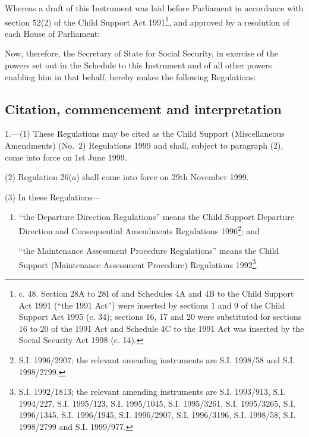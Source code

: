 \documentclass[12pt,a4paper]{article}
\title{\regstitle}
\author{S.I. 1999 No. 1047}
\date{Made 29th March 1999\\Coming into force\\---except for regulation 26($a$) 1st June 1999\\---regulation 26($a$) 29th November 1999}
\begin{document}
\maketitle

\noindent
Whereas a draft of this Instrument was laid before Parliament in accordance with section 52(2) of the Child Support Act 1991\footnote{ c. 48. Section 28A to 28I of and Schedules 4A and 4B to the Child Support Act 1991 (“the 1991 Act”) were inserted by sections 1 and 9 of the Child Support Act 1995 (c. 34); sections 16, 17 and 20 were substituted for sections 16 to 20 of the 1991 Act and Schedule 4C to the 1991 Act was inserted by the Social Security Act 1998 (c. 14).}, and approved by a resolution of each House of Parliament:

 Now, therefore, the Secretary of State for Social Security, in exercise of the powers set out in the Schedule to this Instrument and of all other powers enabling him in that behalf, hereby makes the following Regulations:

{\sloppy

\tableofcontents

}

\bigskip

\setcounter{secnumdepth}{-2}

\subsection[1. Citation, commencement and interpretation]{Citation, commencement and interpretation}

1.—(1) These Regulations may be cited as the Child Support (Miscellaneous Amendments) (No.\ 2) Regulations 1999 and shall, subject to paragraph (2), come into force on 1st June 1999.

(2) Regulation 26($a$) shall come into force on 29th November 1999.

(3) In these Regulations---
\begin{enumerate}\item[]
“the Departure Direction Regulations” means the Child Support Departure Direction and Consequential Amendments Regulations 1996\footnote{\frenchspacing S.I. 1996/2907; the relevant amending instruments are S.I. 1998/58 and S.I. 1998/2799.}; and

“the Maintenance Assessment Procedure Regulations” means the Child Support (Maintenance Assessment Procedure) Regulations 1992\footnote{\frenchspacing S.I. 1992/1813; the relevant amending instruments are S.I. 1993/913, S.I. 1994/227, S.I. 1995/123, S.I. 1995/1045, S.I. 1995/3261, S.I. 1995/3265, S.I. 1996/1345, S.I. 1996/1945, S.I. 1996/2907, S.I. 1996/3196, S.I. 1998/58, S.I. 1998/2799 and S.I. 1999/977.}.
\end{enumerate}
\end{document}
